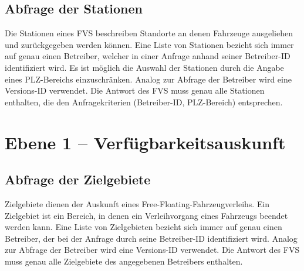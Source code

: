\subsection{Abfrage der Stationen}
Die Stationen eines FVS beschreiben Standorte an denen Fahrzeuge ausgeliehen und zurückgegeben werden können. Eine Liste von Stationen bezieht sich immer auf genau einen Betreiber, welcher in einer Anfrage anhand seiner Betreiber-ID identifiziert wird. Es ist möglich die Auswahl der Stationen durch die Angabe eines PLZ-Bereichs einzuschränken. Analog zur Abfrage der Betreiber wird eine Versions-ID verwendet.
Die Antwort des FVS muss genau alle Stationen enthalten, die den Anfragekriterien (Betreiber-ID, PLZ-Bereich) entsprechen.

\section{Ebene 1 -- Verfügbarkeitsauskunft}

\subsection{Abfrage der Zielgebiete}
Zielgebiete dienen der Auskunft eines Free-Floating-Fahrzeugverleihs. Ein Zielgebiet ist ein Bereich, in denen ein Verleihvorgang eines Fahrzeugs beendet werden kann.
Eine Liste von Zielgebieten bezieht sich immer auf genau einen Betreiber, der bei der Anfrage durch seine Betreiber-ID identifiziert wird. Analog zur Abfrage der Betreiber wird eine Versions-ID verwendet. Die Antwort des FVS muss genau alle Zielgebiete des angegebenen Betreibers enthalten.


